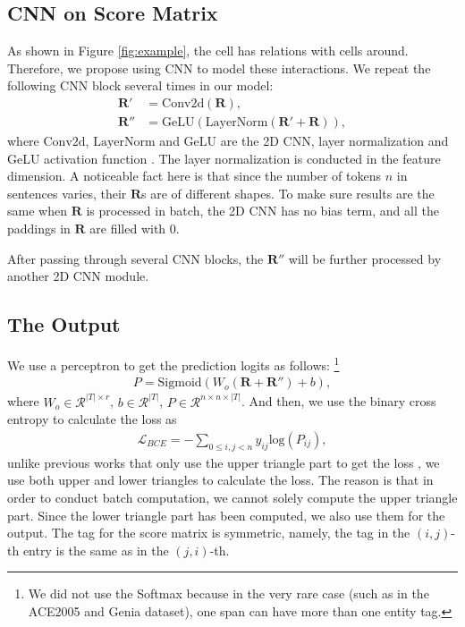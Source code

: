 \documentclass[11pt]{article}
\begin{document}
\subsection{CNN on Score Matrix}
As shown in Figure \ref{fig:example}, the cell has relations with cells around. Therefore, we propose using CNN to model these interactions. We repeat the following CNN block several times in our model:
\begin{align}
  \mathbf{R}' & = \mathrm{Conv2d}(\mathbf{R}), \nonumber \\
  \mathbf{R}'' & = \mathrm{GeLU}(\mathrm{LayerNorm}(\mathbf{R}' + \mathbf{R})), \nonumber
\end{align}
where $\mathrm{Conv2d}$, $\mathrm{LayerNorm}$ and $\mathrm{GeLU}$ are the 2D CNN, layer normalization \cite{DBLP:journals/corr/BaKH16} and GeLU activation function \cite{DBLP:journals/corr/HendrycksG16}. The layer normalization is conducted in the feature dimension. A noticeable fact here is that since the number of tokens $n$ in sentences varies, their $\mathbf{R}$s are of different shapes. To make sure results are the same when $\mathbf{R}$ is processed in batch, the 2D CNN has no bias term, and all the paddings in $\mathbf{R}$ are filled with 0. 

After passing through several CNN blocks, the $\mathbf{R}''$ will be further processed by another 2D CNN module. 

\subsection{The Output}
We use a perceptron to get the prediction logits as follows: \footnote{We did not use the Softmax because in the very rare case (such as in the ACE2005 and Genia dataset), one span can have more than one entity tag.}
\begin{align}
  P = \mathrm{Sigmoid}(W_o(\mathbf{R}+\mathbf{R}'') + b), \nonumber
\end{align}
where $W_o \in \mathcal{R}^{|T|\times r}$, $b \in \mathcal{R}^{|T|}$, $P \in \mathcal{R}^{n \times n \times |T|}$. And then, we use the binary cross entropy to calculate the loss as 
\begin{align}
 \mathcal{L}_{BCE} = - \sum_{0 \le i,j<n}y_{ij}\mathrm{log}(P_{ij}), \nonumber
\end{align}
unlike previous works that only use the upper triangle part to get the loss \cite{DBLP:conf/acl/YuBP20,DBLP:conf/acl/Zhu022},  we use both upper and lower triangles to calculate the loss. The reason is that in order to conduct batch computation, we cannot solely compute the upper triangle part. Since the lower triangle part has been computed, we also use them for the output. The tag for the score matrix is symmetric, namely, the tag in the $(i,j)$-th entry is the same as in the $(j, i)$-th. 
\end{document}

